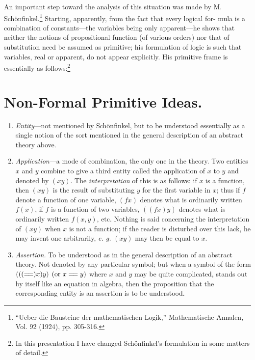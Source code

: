 \documentclass[10pt, twoside]{extarticle}
\newcommand\litem[1]{\item{\textit{#1}}}
\newcommand\longeq{=\joinrel=}
\theoremstyle{breaktheorem}
\theoremstyle{mylemma}
\theoremstyle{mydefinition}
\theoremstyle{mycorollary}
\begin{document}
An important step toward the analysis of this situation was made by
M. Schönfinkel.\footnote{``Ueber die Bausteine der mathematischen Logik,'' Mathematische Annalen, Vol. 92 (1924), pp. 305-316.} Starting, apparently, from the fact that every logical for-
mula is a combination of constants---the variables being only apparent---he
shows that neither the notions of propositional function (of various orders)
nor that of substitution need be assumed as primitive; his formulation of
logic is such that variables, real or apparent, do not appear explicitly. His primitive frame is essentially as follows:\footnote{In this presentation I have changed Schönfinkel's formulation in some matters of detail.}

\section{Non-Formal Primitive Ideas.}
\begin{enumerate}[label=\arabic*.,font=\itshape,wide]
\litem{Entity}---not mentioned by Schönfinkel, but to be understood
essentially as a single notion of the sort mentioned in the general description
of an abstract theory above.

\litem{Application}---a mode of combination, the only one in the theory.
Two entities \(x\) and \(y\) combine to give a third entity called the application of
\(x\) to \(y\) and denoted by \((xy)\). The \textit{interpretation} of this is as follows: if \(x\) is a function,
then \((xy)\) is the result of substituting \(y\) for the first variable in \(x\);
thus if \(f\) denote a function of one variable, \((fx)\) denotes what is ordinarily
written \(f(x)\), if \(f\) is a function of two variables, \(((fx) y)\) denotes what is
ordinarily written \(f(x, y)\), etc. Nothing is said concerning the interpretation
of \((xy)\) when \(x\) is not a function; if the reader is disturbed over this lack,
he may invent one arbitrarily, \textit{e. g.} \((xy)\) may then be equal to \(x\).

\litem{Assertion.} To be understood as in the general description of an
abstract theory. Not denoted by any particular symbol; but when a symbol
of the form \((((\longeq)x)y)\) \((\text{or } x \longeq y)\) where \(x\) and \(y\) may be quite complicated,
stands out by itself like an equation in algebra, then the proposition that the
corresponding entity is an assertion is to be understood.
\end{enumerate}
\end{document}
